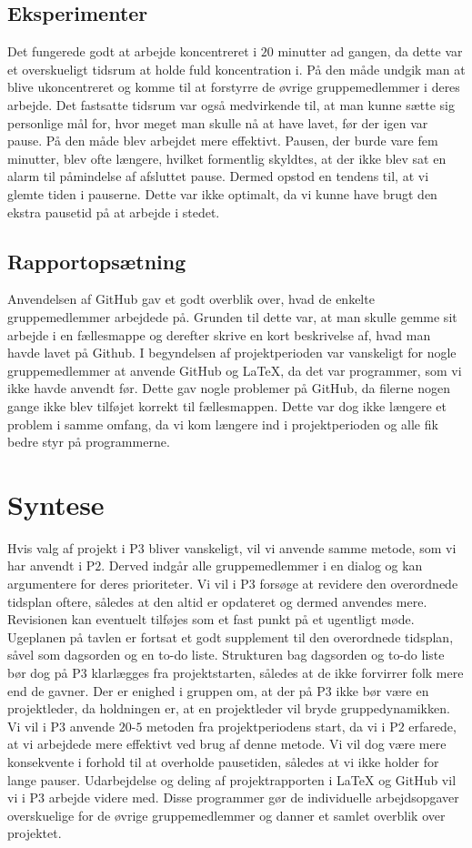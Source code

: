 \subsection{Eksperimenter}
Det fungerede godt at arbejde koncentreret i $20$ minutter ad gangen, da dette var et overskueligt tidsrum at holde fuld koncentration i. På den måde undgik man at blive ukoncentreret og komme til at forstyrre de øvrige gruppemedlemmer i deres arbejde. Det fastsatte tidsrum var også medvirkende til, at man kunne sætte sig personlige mål for, hvor meget man skulle nå at have lavet, før der igen var pause. På den måde blev arbejdet mere effektivt. 
Pausen, der burde vare fem minutter, blev ofte længere, hvilket formentlig skyldtes, at der ikke blev sat en alarm til påmindelse af afsluttet pause. Dermed opstod en tendens til, at vi glemte tiden i pauserne. Dette var ikke optimalt, da vi kunne have brugt den ekstra pausetid på at arbejde i stedet.

\subsection{Rapportopsætning}
Anvendelsen af GitHub gav et godt overblik over, hvad de enkelte gruppemedlemmer arbejdede på. Grunden til dette var, at man skulle gemme sit arbejde i en fællesmappe og derefter skrive en kort beskrivelse af, hvad man havde lavet på Github. 
I begyndelsen af projektperioden var vanskeligt for nogle gruppemedlemmer at anvende GitHub og LaTeX, da det var programmer, som vi ikke havde anvendt før. Dette gav nogle problemer på GitHub, da filerne nogen gange ikke blev tilføjet korrekt til fællesmappen. Dette var dog ikke længere et problem i samme omfang, da vi kom længere ind i projektperioden og alle fik bedre styr på programmerne. 

\section{Syntese}
Hvis valg af projekt i P$3$ bliver vanskeligt, vil vi anvende samme metode, som vi har anvendt i P$2$. Derved indgår alle gruppemedlemmer i en dialog og kan argumentere for deres prioriteter. 
Vi vil i P$3$ forsøge at revidere den overordnede tidsplan oftere, således at den altid er opdateret og dermed anvendes mere. Revisionen kan eventuelt tilføjes som et fast punkt på et ugentligt møde. Ugeplanen på tavlen er fortsat et godt supplement til den overordnede tidsplan, såvel som dagsorden og en to-do liste. Strukturen bag dagsorden og to-do liste bør dog på P$3$ klarlægges fra projektstarten, således at de ikke forvirrer folk mere end de gavner.
Der er enighed i gruppen om, at der på P$3$ ikke bør være en projektleder, da holdningen er, at en projektleder vil bryde gruppedynamikken.
Vi vil i P$3$ anvende $20$-$5$ metoden fra projektperiodens start, da vi i P$2$ erfarede, at vi arbejdede mere effektivt ved brug af denne metode. Vi vil dog være mere konsekvente i forhold til at overholde pausetiden, således at vi ikke holder for lange pauser. 
Udarbejdelse og deling af projektrapporten i LaTeX og GitHub vil vi i P$3$ arbejde videre med. Disse programmer gør de individuelle arbejdsopgaver overskuelige for de øvrige gruppemedlemmer og danner et samlet overblik over projektet.   